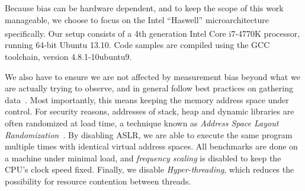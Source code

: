 \documentclass[a4paper,10pt,twocolumn,twoside]{article}
\begin{document}
Because bias can be hardware dependent, and to keep the scope of this work manageable, we choose to focus on the Intel ``Haswell'' microarchitecture specifically.
Our setup consists of a 4th generation Intel\textsuperscript{\textregistered} Core\textsuperscript{\texttrademark} i7-4770K processor, running 64-bit Ubuntu 13.10.
Code samples are compiled using the GCC toolchain, version 4.8.1-10ubuntu9.

We also have to ensure we are not affected by measurement bias beyond what we are actually trying to observe, and in general follow best practices on gathering data~\cite{Mytkowicz:2009:WrongData}.
Most importantly, this means keeping the memory address space under control.
For security reasons, addresses of stack, heap and dynamic libraries are often randomized at load time, a technique known as \emph{Address Space Layout Randomization}~\cite{Shackham:2004:ASLR}. %
By disabling ASLR, we are able to execute the same program multiple times with identical virtual address spaces.
All benchmarks are done on a machine under minimal load, and \emph{frequency scaling} is disabled to keep the CPU's clock speed fixed.
Finally, we disable \emph{Hyper-threading}, which reduces the possibility for resource contention between threads.



%


\end{document}

